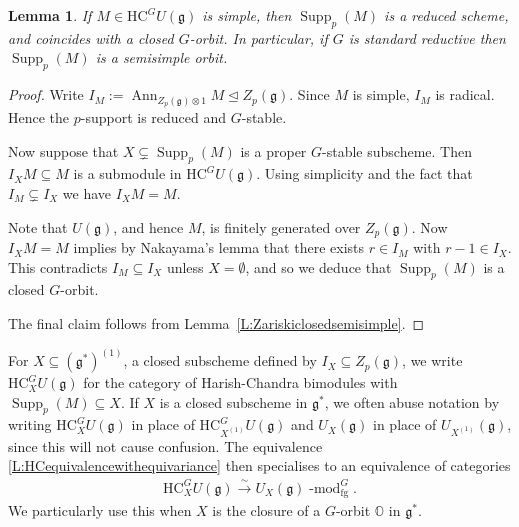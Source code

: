 \documentclass[twoside,12pt,reqno]{amsart}
\newtheorem{Lemma}[Theorem]{Lemma}
\theoremstyle{remark}
\numberwithin{equation}{section}
\def\isoto{\overset{\sim}{\longrightarrow}}
\def\lmod{\!\operatorname{-mod}}
\def\Ann{\operatorname{Ann}}
\def\Supp{\operatorname{Supp}}
\def\O{{\mathbb O}}
\def\HC{\mathrm{HC}}
\def\g{{\mathfrak g}}
\newcommand{\fg}{\operatorname{fg}}
\begin{document}
 \begin{Lemma}
 \label{L:suportsemisimple}
    If $M \in \HC^G U(\g)$ is simple, then $\Supp_p(M)$ is a reduced scheme, and coincides with a closed $G$-orbit. In particular, if $G$ is standard reductive then $\Supp_p(M)$ is a semisimple orbit.
 \end{Lemma}
    \begin{proof}
        Write $I_M := \Ann_{Z_p(\g)\otimes 1} M \unlhd Z_p(\g)$. Since $M$ is simple, $I_M$ is radical. Hence the $p$-support is reduced and $G$-stable.
        
        Now suppose that $X \subsetneq \Supp_p(M)$ is a proper $G$-stable subscheme. Then $I_X M \subseteq M$ is a  submodule in $\HC^G U(\g)$. Using simplicity and the fact that $I_M \subsetneq I_X$ we have $I_XM = M$.

        Note that $U(\g)$, and hence $M$, is finitely generated over $Z_p(\g)$. Now $I_X M = M$ implies by Nakayama's lemma that there exists $r\in I_M$ with $r-1\in I_X$. This contradicts $I_M\subseteq I_X$ unless $X=\emptyset$, and so we deduce that $\Supp_p(M)$ is a closed $G$-orbit.
        
        The final claim follows from Lemma~\ref{L:Zariskiclosedsemisimple}.
    \end{proof}

For $X \subseteq (\g^*)^{(1)}$, a closed subscheme defined by $I_X \subseteq Z_p(\g)$, we write $\HC_X^G U(\g)$ for the category of Harish-Chandra bimodules with $\Supp_p(M) \subseteq X$. If $X$ is a closed subscheme in $\g^*$, we often abuse notation by writing $\HC_X^G U(\g)$ in place of $\HC_{X^{(1)}}^G U(\g)$ and $U_X(\g)$ in place of $U_{X^{(1)}}(\g)$, since this will not cause confusion. The equivalence \eqref{L:HCequivalencewithequivariance} then specialises to an equivalence of categories
\begin{eqnarray}
    \label{eq:HCequivalencewithequivariance+support}
    \HC_X^G U(\g) \isoto U_X(\g)\lmod^G_{\fg}.
\end{eqnarray} We particularly use this when $X$ is the closure of a $G$-orbit $\O$ in $\g^*$.
\end{document}
